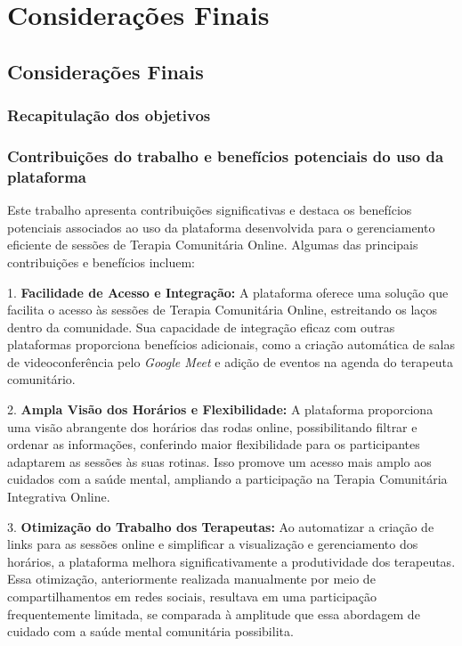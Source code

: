 \part{Considerações Finais}
\chapter{Considerações Finais}
\section{Recapitulação dos objetivos}

\section{Contribuições do trabalho e benefícios potenciais do uso da plataforma}
    Este trabalho apresenta contribuições significativas e destaca os benefícios potenciais associados ao uso da plataforma desenvolvida para o gerenciamento eficiente de sessões de Terapia Comunitária Online. Algumas das principais contribuições e benefícios incluem:
    
    1. \textbf{Facilidade de Acesso e Integração:}
       A plataforma oferece uma solução que facilita o acesso às sessões de Terapia Comunitária Online, estreitando os laços dentro da comunidade. Sua capacidade de integração eficaz com outras plataformas proporciona benefícios adicionais, como a criação automática de salas de videoconferência pelo \textit{Google Meet} e adição de eventos na agenda do terapeuta comunitário.
    
    2. \textbf{Ampla Visão dos Horários e Flexibilidade:}
       A plataforma proporciona uma visão abrangente dos horários das rodas online, possibilitando filtrar e ordenar as informações, conferindo maior flexibilidade para os participantes adaptarem as sessões às suas rotinas. Isso promove um acesso mais amplo aos cuidados com a saúde mental, ampliando a participação na Terapia Comunitária Integrativa Online.
    
    3. \textbf{Otimização do Trabalho dos Terapeutas:}
       Ao automatizar a criação de links para as sessões online e simplificar a visualização e gerenciamento dos horários, a plataforma melhora significativamente a produtividade dos terapeutas. Essa otimização, anteriormente realizada manualmente por meio de compartilhamentos em redes sociais, resultava em uma participação frequentemente limitada, se comparada à amplitude que essa abordagem de cuidado com a saúde mental comunitária possibilita.
    
